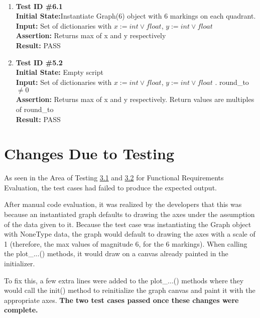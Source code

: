 \documentclass[12pt, titlepage]{article}
\begin{document}
	\paragraph{}
		\begin{enumerate}
			\item{\textbf{Test ID \#6.1\\}}
			\textbf{Initial State:}Instantiate Graph(6) object with 6 markings on each quadrant.\\
			\textbf{Input:} Set of dictionaries with $x:= int \vee float$, $y:= int \vee float$ \\
			\textbf{Assertion:} Returns max of x and y respectively\\
			\textbf{Result:} PASS
			
			\item{\textbf{Test ID \#5.2\\}}
			\textbf{Initial State:} Empty script\\
			\textbf{Input:} Set of dictionaries with $x:= int \vee float$, $y:= int \vee float$ . round\_to $\neq 0$ \\
			\textbf{Assertion:}  Returns max of x and y respectively. Return values are multiples of round\_to \\
			\textbf{Result:} PASS

		\end{enumerate}	



\section{Changes Due to Testing}

As seen in the Area of Testing \hyperref[sec:3.1]{3.1} and \hyperref[sec:3.2]{3.2} for Functional Requirements Evaluation, the test cases had failed to produce the expected output. 

After manual code evaluation, it was realized by the developers that this was because an instantiated graph defaults to drawing the axes under the assumption of the data given to it. Because the test case was instantiating the Graph object with NoneType data, the graph would default to drawing the axes with a scale of 1 (therefore, the max values of magnitude 6, for the 6 markings). When calling the plot\_...() methods, it would draw on a canvas already painted in the initializer. 

To fix this, a few extra lines were added to the plot\_...() methods where they would call the init() method to reinitialize the graph canvas and paint it with the appropriate axes. 
\textbf{The two test cases passed once these changes were complete.}  \\
\end{document}
